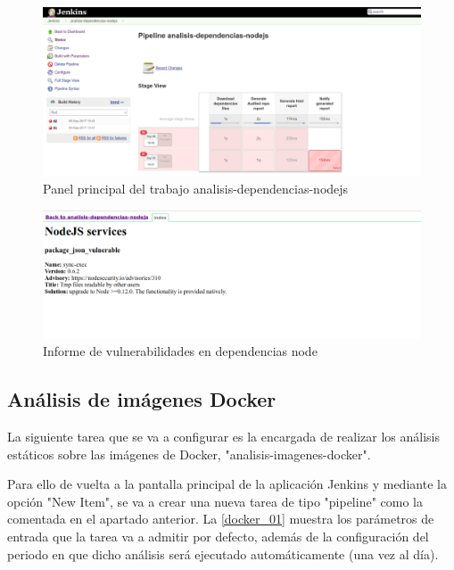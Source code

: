 \begin{figure}[H]
	\centering
	\includegraphics[width=0.90\linewidth]
	{desarrollo/figuras/node_01.png}
	\caption{Panel principal del trabajo analisis-dependencias-nodejs}
	\label{node_01}
\end{figure}

\begin{figure}[H]
	\centering
	\includegraphics[width=0.90\linewidth]
	{desarrollo/figuras/node_02.png}
	\caption{Informe de vulnerabilidades en dependencias node}
	\label{node_02}
\end{figure}


\subsection{Análisis de imágenes Docker}

La siguiente tarea que se va a configurar es la encargada de realizar los análisis estáticos sobre las imágenes de Docker, "analisis-imagenes-docker".

Para ello de vuelta a la pantalla principal de la aplicación Jenkins y mediante la opción "New Item", se va a crear una nueva tarea de tipo "pipeline" como la comentada en el apartado anterior. La \autoref{docker_01} muestra los parámetros de entrada que la tarea va a admitir por defecto, además de la configuración del periodo en que dicho análisis será ejecutado automáticamente (una vez al día).

